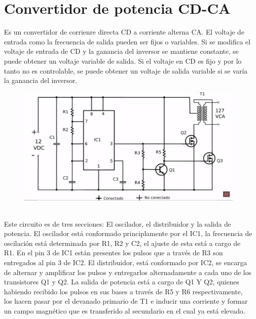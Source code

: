 \documentclass[11pt]{article}
\begin{document}
\section{Convertidor de potencia CD-CA}
Es un convertidor de corrienre directa CD a corriente alterna CA. El voltaje de entrada como la frecuencia de salida pueden ser fijos o variables. Si se modifica el voltaje de entrada de CD y la ganancia del inversor se mantiene constante, se puede obtener un voltaje variable de salida. Si el voltaje en CD es fijo y por lo tanto no es controlable, se puede obtener un voltaje de salida variable si se var\'ia la ganancia del inversor.
\begin{figure}[htp]
\centering
\includegraphics[scale=.30]{CD-CA.jpg}
\caption{}
\label{}
\end{figure}\\
Este circuito es de tres secciones: El oscilador, el distribuidor y la salida de potencia.
El oscilador est\'a conformado principlamente por el IC1, la frecuencia de oscilaci\'on est\'a determinada por R1, R2 y C2, el ajuste de esta est\'a a cargo de R1. En el pin 3 de IC1 est\'an presentes los pulsos que a trav\'es de R3 son entregados al pin 3 de IC2. El distribuidor, est\'a conformado por IC2, se encarga de alternar y amplificar los pulsos y entregarlos alternadamente a cada uno de los transistores Q1 y Q2.
La salida de potencia est\'a a cargo de Q1 Y Q2, quienes habiendo recibido los pulsos en sus bases a través de R5 y R6 respectivamente, los hacen pasar por el devanado primario de T1 e inducir una corriente y formar un campo magn\'etico que es transferido al secundario en el cual ya est\'a elevado.\\
\end{document}
